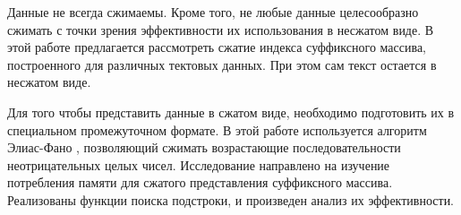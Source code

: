 Данные не всегда сжимаемы. Кроме того, не любые данные целесообразно сжимать с точки зрения эффективности
их использования в несжатом виде. В этой работе предлагается рассмотреть сжатие индекса суффиксного массива,
построенного для различных тектовых данных. При этом сам текст остается в несжатом виде.


Для того чтобы представить данные в сжатом виде, необходимо подготовить их
в специальном промежуточном формате. В этой работе используется алгоритм Элиас-Фано \cite{pibiri2014dynamic},
позволяющий сжимать возрастающие последовательности неотрицательных целых чисел.
Исследование направлено на изучение потребления памяти для сжатого представления суффиксного массива.
Реализованы функции поиска подстроки, и произведен анализ их эффективности.

